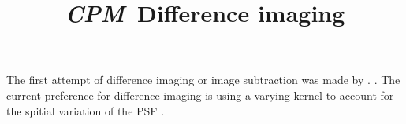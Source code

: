 \documentclass[12pt, preprint]{aastex}
\newcommand{\project}[1]{\textsl{#1}}
\newcommand{\cpm}{\project{CPM}}
\begin{document}
\title{\cpm\ Difference imaging}
\author{}

\section{}
The first attempt of difference imaging or image subtraction was made by \cite{imagesub1}.
\cite{alard}.
The current preference for difference imaging is using a varying kernel to account for the spitial variation of the PSF \citep{varyingkernel}. 


\clearpage

\clearpage
\end{document}

